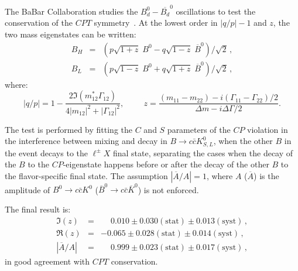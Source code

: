 The BaBar Collaboration studies the $B_d^0-\overline{B_d}^0$ oscillations to
test the conservation of the $CPT$ symmetry~\cite{babar_cpt}. At the lowest order in $|q/p|-1$
and $z$, the two mass eigenstates can be written:
\begin{eqnarray}
B_H & = & (p\sqrt{1+z} \; B^0 - q\sqrt{1-z} \; \overline{B}^0) / \sqrt{2} \,, \\
B_L & = & (p\sqrt{1-z} \; B^0 + q\sqrt{1+z} \; \overline{B}^0) / \sqrt{2} \,,
\end{eqnarray}
where:
\begin{equation}
  |q/p| = 1 - \frac{2 \Im(m_{12}^* \Gamma_{12})}{4|m_{12}|^2 + |\Gamma_{12}|^2}, \hspace{1cm}
  z = \frac{(m_{11}-m_{22}) - i (\Gamma_{11} - \Gamma_{22})/2}{\Delta m - i \Delta \Gamma /2}.
\end{equation}

The test is performed by fitting the $C$ and $S$ parameters of the $CP$ violation in the
interference between mixing and decay in $B \to c\bar{c} K^0_{S,L}$, when the other $B$
in the event decays to the $\ell^{\pm}X$ final state, separating the cases when the decay
of the $B$ to the $CP$-eigenstate happens before or after the decay of the other $B$ to
the flavor-specific final state. The assumption $|\overline{A}/A|=1$, where $A$ ($\overline{A}$)
is the amplitude of $B^0 \to c\bar{c} K^0$ ($\overline{B}^0 \to c\bar{c} \overline{K}^0$) is
not enforced.

The final result is:
\begin{eqnarray}
  \Im (z) & = &\phantom{-} 0.010 \pm 0.030 (\mbox{stat}) \pm 0.013 (\mbox{syst}) \, ,\\
  \Re (z) & = & -0.065 \pm 0.028 (\mbox{stat}) \pm 0.014 (\mbox{syst}) \, ,\\
  |\overline{A}/{A}| & = & \phantom{-} 0.999 \pm 0.023 (\mbox{stat}) \pm 0.017 (\mbox{syst}) \, ,
\end{eqnarray}
in good agreement with $CPT$ conservation.
  
